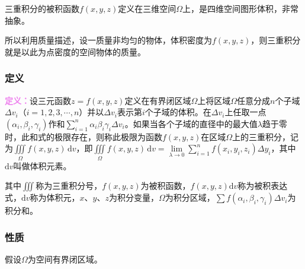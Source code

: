 \documentclass[UTF8, 12pt]{ctexart}
\begin{document}
三重积分的被积函数$f(x,y,z)$定义在三维空间$\Omega$上，是四维空间图形体积，非常抽象。

所以利用质量描述，设一质量非均匀的物体，体积密度为$f(x,y,z)$，则三重积分就是以此为点密度的空间物体的质量。

\subsubsection{定义}

\textcolor{violet}{\textbf{定义：}}设三元函数$z=f(x,y,z)$定义在有界闭区域$\Omega$上将区域$\Omega$任意分成$n$个子域$\Delta v_i$（$i=1,2,3,\cdots,n$）并以$\Delta v_i$表示第$i$个子域的体积。在$\Delta v_i$上任取一点$(\alpha_i,\beta_i,\gamma_i)$作和$\sum\limits_{i=1}^n\alpha_i\beta_i\gamma_i\Delta v_i$。如果当各个子域的直径中的最大值$\lambda$趋于零时，此和式的极限存在，则称此极限为函数$f(x,y,z)$在区域$\Omega$上的三重积分，记为$\iiint\limits_\Omega f(x,y,z)\,\textrm{d}v$，即$\iiint\limits_\Omega f(x,y,z)\,\textrm{d}v=\lim\limits_{\lambda\to0}\sum\limits_{i=1}^nf(x_i,y_i,z_i)\Delta y_i$，其中$\textrm{d}v$叫做体积元素。

其中$\iiint$称为三重积分号，$f(x,y,z)$为被积函数，$f(x,y,z)\textrm{d}v$称为被积表达式，$\textrm{d}v$称为体积元，$x$、$y$、$z$为积分变量，$\Omega$为积分区域，$\sum f(\alpha_i,\beta_i,\gamma_i)\Delta v_i$为积分和。

\subsubsection{性质}

假设$\Omega$为空间有界闭区域。
\end{document}
